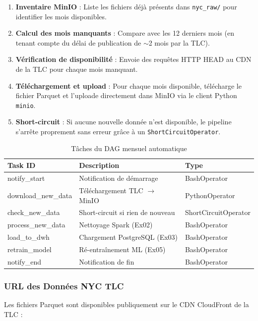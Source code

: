 \documentclass[12pt,a4paper]{report}
\begin{document}
\begin{enumerate}
    \item \textbf{Inventaire MinIO} : Liste les fichiers déjà présents dans \texttt{nyc\_raw/} pour identifier les mois disponibles.
    \item \textbf{Calcul des mois manquants} : Compare avec les 12 derniers mois (en tenant compte du délai de publication de $\sim$2 mois par la TLC).
    \item \textbf{Vérification de disponibilité} : Envoie des requêtes HTTP HEAD au CDN de la TLC pour chaque mois manquant.
    \item \textbf{Téléchargement et upload} : Pour chaque mois disponible, télécharge le fichier Parquet et l'uploade directement dans MinIO via le client Python \texttt{minio}.
    \item \textbf{Short-circuit} : Si aucune nouvelle donnée n'est disponible, le pipeline s'arrête proprement sans erreur grâce à un \texttt{ShortCircuitOperator}.
\end{enumerate}

\begin{table}[H]
\centering
\caption{Tâches du DAG mensuel automatique}
\begin{tabular}{@{}lll@{}}
\toprule
\textbf{Task ID} & \textbf{Description} & \textbf{Type} \\
\midrule
notify\_start & Notification de démarrage & BashOperator \\
download\_new\_data & Téléchargement TLC $\rightarrow$ MinIO & PythonOperator \\
check\_new\_data & Short-circuit si rien de nouveau & ShortCircuitOperator \\
process\_new\_data & Nettoyage Spark (Ex02) & BashOperator \\
load\_to\_dwh & Chargement PostgreSQL (Ex03) & BashOperator \\
retrain\_model & Ré-entraînement ML (Ex05) & BashOperator \\
notify\_end & Notification de fin & BashOperator \\
\bottomrule
\end{tabular}
\end{table}

\subsubsection{URL des Données NYC TLC}

Les fichiers Parquet sont disponibles publiquement sur le CDN CloudFront de la TLC :
\end{document}
